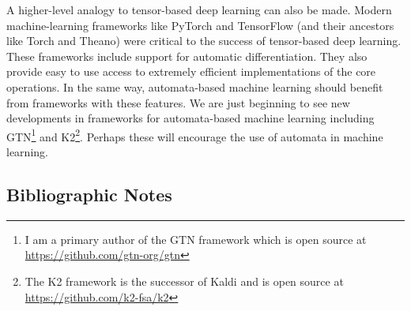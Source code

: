 \documentclass[main.tex]{subfiles}
\begin{document}
A higher-level analogy to tensor-based deep learning can also be made. Modern
machine-learning frameworks like PyTorch and TensorFlow (and their ancestors
like Torch and Theano) were critical to the success of tensor-based deep
learning. These frameworks include support for automatic differentiation. They
also provide easy to use access to extremely efficient implementations of the
core operations. In the same way, automata-based machine learning should
benefit from frameworks with these features. We are just beginning to see new
developments in frameworks for automata-based machine learning including
GTN\footnote{I am a primary author of the GTN framework which is open source at
\url{https://github.com/gtn-org/gtn}} and K2\footnote{The K2 framework is the
successor of Kaldi and is open source at \url{https://github.com/k2-fsa/k2}}.
Perhaps these will encourage the use of automata in machine learning.

\subsection{Bibliographic Notes}



\end{document}
